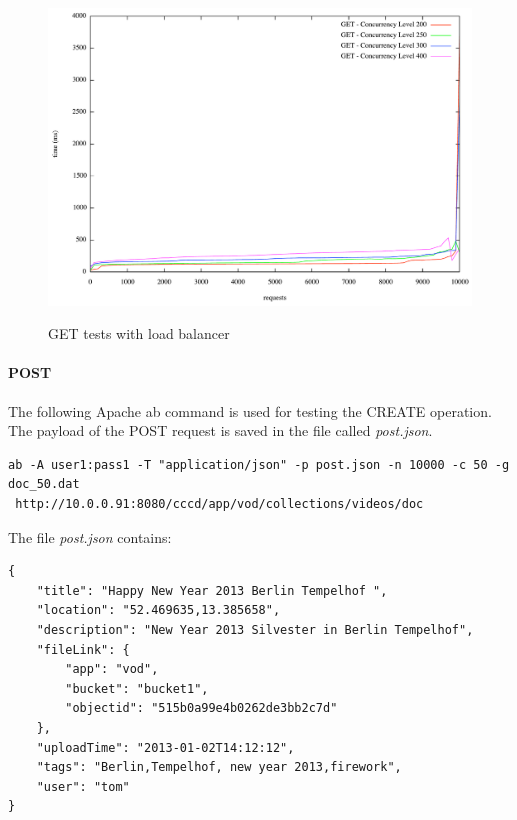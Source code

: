 \begin{itemize}
\begin{figure}[htb]
  \centering
  \includegraphics[scale=0.4]{img/With_LoadBalancer_200_250_300_400_GET}\\
  \caption{GET tests with load balancer}
  \label{fig:get_with_load}
\end{figure}
\end{itemize}

\paragraph{POST}
The following Apache ab command is used for testing the CREATE operation. The payload of the POST request is saved in the file called \textit{post.json}. 
\begin{code}
\begin{verbatim}
ab -A user1:pass1 -T "application/json" -p post.json -n 10000 -c 50 -g doc_50.dat 
 http://10.0.0.91:8080/cccd/app/vod/collections/videos/doc
\end{verbatim}
\end{code}
The file \textit{post.json} contains:
\begin{code}
\begin{verbatim}
{
	"title": "Happy New Year 2013 Berlin Tempelhof ",
	"location": "52.469635,13.385658",
	"description": "New Year 2013 Silvester in Berlin Tempelhof",
	"fileLink": {
		"app": "vod",
		"bucket": "bucket1",
		"objectid": "515b0a99e4b0262de3bb2c7d"
	},
	"uploadTime": "2013-01-02T14:12:12",
	"tags": "Berlin,Tempelhof, new year 2013,firework",
	"user": "tom"
}
\end{verbatim}
\end{code}

